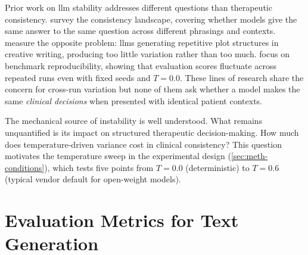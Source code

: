 Prior work on \gls{llm} stability addresses different questions than
therapeutic consistency. \textcite{BMA3X2SS} survey the consistency
landscape, covering whether models give the same answer to the same
question across different phrasings and contexts. \textcite{RPEDMF63}
measure the opposite problem: \glspl{llm} generating repetitive plot
structures in creative writing, producing too little variation rather
than too much. \textcite{54A9ZU2N} focus on benchmark reproducibility,
showing that evaluation scores fluctuate across repeated runs even with
fixed seeds and $T = 0.0$. These lines of research share the concern for cross-run variation
but none of them ask whether a model makes the same \emph{clinical
decisions} when presented with identical patient contexts.

The mechanical source of instability is well understood. What remains
unquantified is its impact on structured therapeutic decision-making. How
much does temperature-driven variance cost in clinical consistency? This
question motivates the temperature sweep in the experimental design
(\autoref{sec:meth-conditions}), which tests five points from $T = 0.0$
(deterministic) to $T = 0.6$ (typical vendor default for open-weight
models).



\section{Evaluation Metrics for Text Generation}
\label{sec:bg-metrics}
%
%
%

